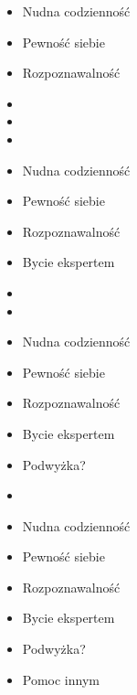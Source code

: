 \documentclass{beamer}
\begin{document}
\begin{frame}{}
	\begin{Large}
		\begin{itemize}
			\item Nudna codzienność
			\item Pewność siebie
			\item Rozpoznawalność
			\item 
			\item 
			\item 
		\end{itemize}
	\end{Large}
\end{frame}

\begin{frame}{}
	\begin{Large}
		\begin{itemize}
			\item Nudna codzienność
			\item Pewność siebie
			\item Rozpoznawalność
			\item Bycie ekspertem
			\item 
			\item 
		\end{itemize}
	\end{Large}
\end{frame}

\begin{frame}{}
	\begin{Large}
		\begin{itemize}
			\item Nudna codzienność
			\item Pewność siebie
			\item Rozpoznawalność
			\item Bycie ekspertem
			\item Podwyżka?
			\item 
		\end{itemize}
	\end{Large}
\end{frame}

\begin{frame}{}
	\begin{Large}
		\begin{itemize}
			\item Nudna codzienność
			\item Pewność siebie
			\item Rozpoznawalność
			\item Bycie ekspertem
			\item Podwyżka?
			\item Pomoc innym
		\end{itemize}
	\end{Large}
\end{frame}
\end{document}
